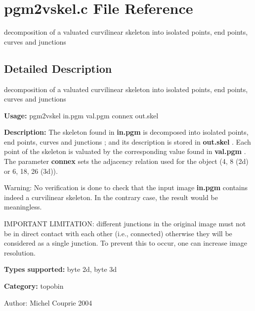 \section{pgm2vskel.c File Reference}
\label{pgm2vskel_8c}
decomposition of a valuated curvilinear skeleton into isolated points, end points, curves and junctions 



\subsection{Detailed Description}
decomposition of a valuated curvilinear skeleton into isolated points, end points, curves and junctions 

{\bf Usage:} pgm2vskel in.pgm val.pgm connex out.skel

{\bf Description:} The skeleton found in {\bf in.pgm} is decomposed into isolated points, end points, curves and junctions ; and its description is stored in {\bf out.skel} . Each point of the skeleton is valuated by the corresponding value found in {\bf val.pgm} . The parameter {\bf connex} sets the adjacency relation used for the object (4, 8 (2d) or 6, 18, 26 (3d)).

\begin{Desc}
\item[Warning:]No verification is done to check that the input image {\bf in.pgm} contains indeed a curvilinear skeleton. In the contrary case, the result would be meaningless.

IMPORTANT LIMITATION: different junctions in the original image must not be in direct contact with each other (i.e., connected) otherwise they will be considered as a single junction. To prevent this to occur, one can increase image resolution.\end{Desc}
{\bf Types supported:} byte 2d, byte 3d

{\bf Category:} topobin

\begin{Desc}
\item[Author:]Michel Couprie 2004 \end{Desc}
